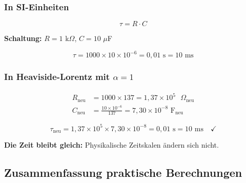 	\subsubsection{In SI-Einheiten}
	
	\begin{equation}
		\tau = R \cdot C
	\end{equation}
	
	\textbf{Schaltung:} $R = 1$ k$\Omega$, $C = 10$ $\mu$F
	
	\begin{equation}
		\tau = 1000 \times 10 \times 10^{-6} = 0{,}01 \text{ s} = 10 \text{ ms}
	\end{equation}
	
	\subsubsection{In Heaviside-Lorentz mit $\alpha = 1$}
	
	\begin{align}
		R_{\text{neu}} &= 1000 \times 137 = 1{,}37 \times 10^{5} \text{ }\Omega_{\text{neu}} \\
		C_{\text{neu}} &= \frac{10 \times 10^{-6}}{137} = 7{,}30 \times 10^{-8} \text{ F}_{\text{neu}}
	\end{align}
	
	\begin{equation}
		\tau_{\text{neu}} = 1{,}37 \times 10^{5} \times 7{,}30 \times 10^{-8} = 0{,}01 \text{ s} = 10 \text{ ms} \quad \checkmark
	\end{equation}
	
	\textbf{Die Zeit bleibt gleich:} Physikalische Zeitskalen ändern sich nicht.
	
	\subsection{Zusammenfassung praktische Berechnungen}
	
	\begin{table}[h]
		\centering
		\caption{Umrechnungsfaktoren SI → HL mit $\alpha = 1$ (Faktoren für die Einheiten; Zahlenwerte werden durch den Faktor geteilt)}
	\end{table}
	

